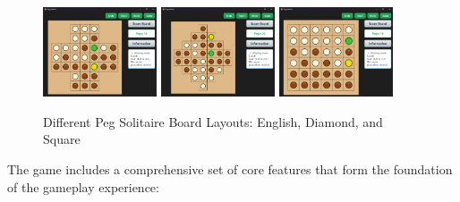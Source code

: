\begin{figure}[btp]
    \centering
    \includegraphics[width=0.3\textwidth]{resource/EnglishBoard.png}
    \includegraphics[width=0.3\textwidth]{resource/DiamondBoard.png}
    \includegraphics[width=0.3\textwidth]{resource/SquareBoard.png}
    \caption{Different Peg Solitaire Board Layouts: English, Diamond, and Square}
    \label{fig:english-board}
\end{figure}

The game includes a comprehensive set of core features that form the foundation of the gameplay experience:

